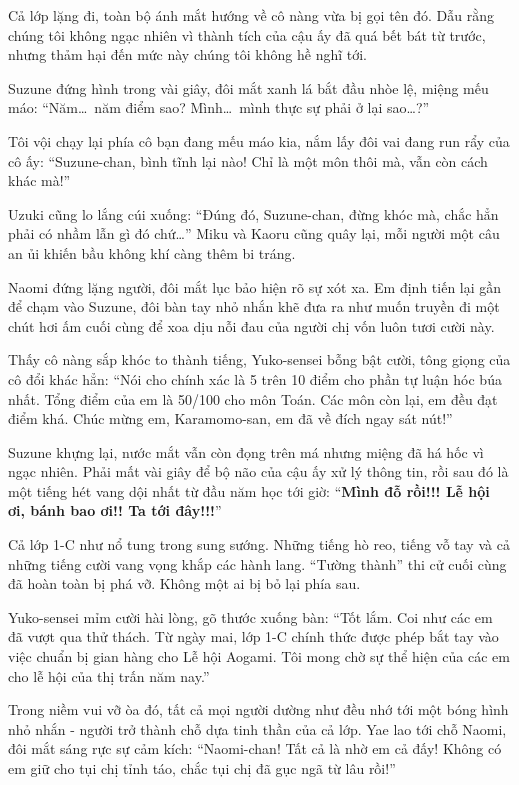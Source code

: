 \documentclass[../main.tex]{subfiles}
\begin{document}
Cả lớp lặng đi, toàn bộ ánh mắt hướng về cô nàng vừa bị gọi tên đó. Dẫu rằng chúng tôi không ngạc nhiên vì thành tích của cậu ấy đã quá bết bát từ trước, nhưng thảm hại đến mức này chúng tôi không hề nghĩ tới.

Suzune đứng hình trong vài giây, đôi mắt xanh lá bắt đầu nhòe lệ, miệng mếu máo: ``Năm\dots\ năm điểm sao? Mình\dots\ mình thực sự phải ở lại sao\dots?''

Tôi vội chạy lại phía cô bạn đang mếu máo kia, nắm lấy đôi vai đang run rẩy của cô ấy: ``Suzune-chan, bình tĩnh lại nào! Chỉ là một môn thôi mà, vẫn còn cách khác mà!''

Uzuki cũng lo lắng cúi xuống: ``Đúng đó, Suzune-chan, đừng khóc mà, chắc hẳn phải có nhầm lẫn gì đó chứ\dots'' Miku và Kaoru cũng quây lại, mỗi người một câu an ủi khiến bầu không khí càng thêm bi tráng.

Naomi đứng lặng người, đôi mắt lục bảo hiện rõ sự xót xa. Em định tiến lại gần để chạm vào Suzune, đôi bàn tay nhỏ nhắn khẽ đưa ra như muốn truyền đi một chút hơi ấm cuối cùng để xoa dịu nỗi đau của người chị vốn luôn tươi cười này.

Thấy cô nàng sắp khóc to thành tiếng, Yuko-sensei bỗng bật cười, tông giọng của cô đổi khác hẳn: ``Nói cho chính xác là 5 trên 10 điểm cho phần tự luận hóc búa nhất. Tổng điểm của em là 50/100 cho môn Toán. Các môn còn lại, em đều đạt điểm khá. Chúc mừng em, Karamomo-san, em đã về đích ngay sát nút!''

Suzune khựng lại, nước mắt vẫn còn đọng trên má nhưng miệng đã há hốc vì ngạc nhiên. Phải mất vài giây để bộ não của cậu ấy xử lý thông tin, rồi sau đó là một tiếng hét vang dội nhất từ đầu năm học tới giờ: ``\textbf{Mình đỗ rồi!!! Lễ hội ơi, bánh bao ơi!! Ta tới đây!!!}''

Cả lớp 1-C như nổ tung trong sung sướng. Những tiếng hò reo, tiếng vỗ tay và cả những tiếng cười vang vọng khắp các hành lang. ``Tường thành'' thi cử cuối cùng đã hoàn toàn bị phá vỡ. Không một ai bị bỏ lại phía sau.

Yuko-sensei mỉm cười hài lòng, gõ thước xuống bàn: ``Tốt lắm. Coi như các em đã vượt qua thử thách. Từ ngày mai, lớp 1-C chính thức được phép bắt tay vào việc chuẩn bị gian hàng cho Lễ hội Aogami. Tôi mong chờ sự thể hiện của các em cho lễ hội của thị trấn năm nay.''

Trong niềm vui vỡ òa đó, tất cả mọi người dường như đều nhớ tới một bóng hình nhỏ nhắn - người trở thành chỗ dựa tinh thần của cả lớp. Yae lao tới chỗ Naomi, đôi mắt sáng rực sự cảm kích: ``Naomi-chan! Tất cả là nhờ em cả đấy! Không có em giữ cho tụi chị tỉnh táo, chắc tụi chị đã gục ngã từ lâu rồi!''
\end{document}
